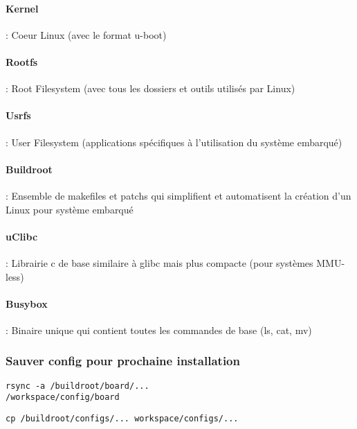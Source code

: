 \paragraph{Kernel} : Coeur Linux (avec le format u-boot)
\paragraph{Rootfs} : Root Filesystem (avec tous les dossiers et outils utilisés par Linux)
\paragraph{Usrfs} : User Filesystem (applications spécifiques à l'utilisation du système embarqué)
\paragraph{Buildroot} : Ensemble de makefiles et patchs qui simplifient et automatisent la création d'un Linux pour système embarqué
\paragraph{uClibc} : Librairie c de base similaire à glibc mais plus compacte (pour systèmes MMU-less)
\paragraph{Busybox} : Binaire unique qui contient toutes les commandes de base (ls, cat, mv)

\subsubsection{Sauver config pour prochaine installation}
\verb+rsync -a /buildroot/board/...+\\
\hspace*{1cm} \verb+/workspace/config/board+

\verb+cp /buildroot/configs/... workspace/configs/...+